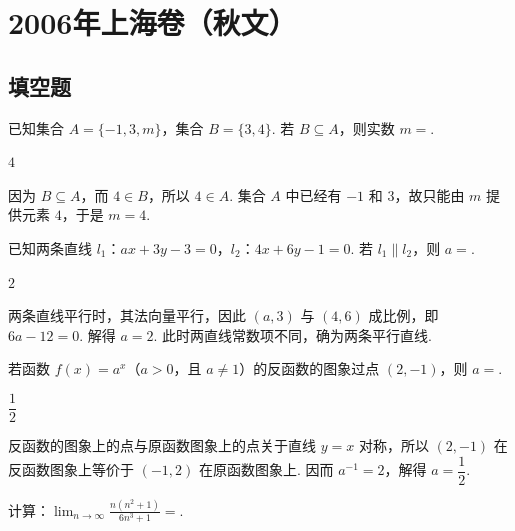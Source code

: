 \chapter{2006年上海卷（秋文）}
\section{填空题}
\begin{problem}
已知集合 \(A = \{-1, 3, m\}\)，集合 \(B = \{3, 4\}\). 若 \(B \subseteq A\)，则实数 \(m = \)\fillinblank{}.
\end{problem}

\begin{answer}
\(4\)
\end{answer}

\begin{solution}
因为 \(B\subseteq A\)，而 \(4\in B\)，所以 \(4\in A\). 集合 \(A\) 中已经有 \(-1\) 和 \(3\)，故只能由 \(m\) 提供元素 \(4\)，于是 \(m=4\).
\end{solution}

\begin{problem}
已知两条直线 \(l_{1}\)：\(ax + 3y - 3 = 0\)，\(l_{2}\)：\(4x + 6y - 1 = 0\). 若 \(l_{1}\parallel l_{2}\)，则 \(a = \)\fillinblank{}.
\end{problem}

\begin{answer}
\(2\)
\end{answer}

\begin{solution}
两条直线平行时，其法向量平行，因此 \((a,3)\) 与 \((4,6)\) 成比例，即 \(6a-12=0\). 解得 \(a=2\). 此时两直线常数项不同，确为两条平行直线.
\end{solution}

\begin{problem}
若函数 \(f(x) = a^x\)（\(a > 0\)，且 \(a \neq 1\)）的反函数的图象过点 \(\left(2,-1\right)\)，则 \(a = \)\fillinblank{}.
\end{problem}

\begin{answer}
\(\dfrac{1}{2}\)
\end{answer}

\begin{solution}
反函数的图象上的点与原函数图象上的点关于直线 \(y=x\) 对称，所以 \((2,-1)\) 在反函数图象上等价于 \((-1,2)\) 在原函数图象上. 因而 \(a^{-1}=2\)，解得 \(a=\dfrac{1}{2}\).
\end{solution}

\begin{problem}
计算：\(\displaystyle\lim_{n\to\infty}\frac{n(n^2 + 1)}{6n^3 + 1} =\)\fillinblank{}.
\end{problem}

